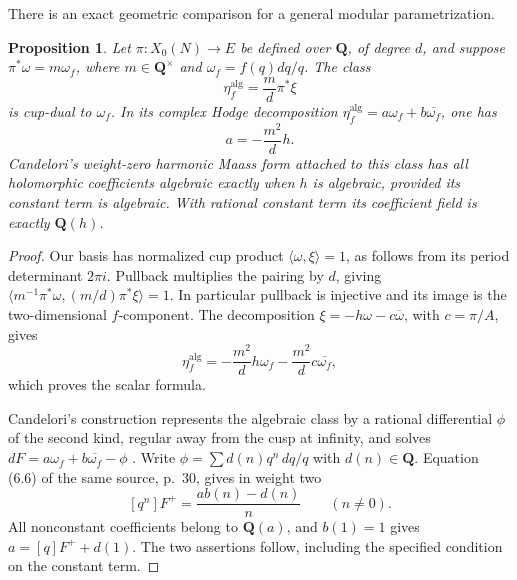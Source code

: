 \documentclass[11pt]{article}
\newtheorem{proposition}[theorem]{Proposition}
\theoremstyle{definition}\newtheorem{definition}[theorem]{Definition}
\theoremstyle{remark}\newtheorem{remark}[theorem]{Remark}
\newcommand{\Q}{\mathbf Q}\newcommand{\Z}{\mathbf Z}
\begin{document}
There is an exact geometric comparison for a general modular parametrization.
\begin{proposition}\label{prop:mock-splitting-scalar}
Let $\pi:X_0(N)\to E$ be defined over $\Q$, of degree $d$, and suppose
$\pi^*\omega=m\omega_f$, where $m\in\Q^\times$ and $\omega_f=f(q)dq/q$.
The class
\[
                   \eta_f^{\mathrm{alg}}=\frac m d\pi^*\xi
\]
is cup-dual to $\omega_f$. In its complex Hodge decomposition
$\eta_f^{\mathrm{alg}}=a\omega_f+b\overline{\omega_f}$, one has
\[
                         a=-\frac{m^2}{d}h.
\]
Candelori's weight-zero harmonic Maass form attached to this class has all holomorphic coefficients algebraic exactly when $h$ is algebraic, provided its constant term is algebraic. With rational constant term its coefficient field is exactly $\Q(h)$.
\end{proposition}
\begin{proof}
Our basis has normalized cup product $\langle\omega,\xi\rangle=1$, as follows from its period determinant $2\pi i$. Pullback multiplies the pairing by $d$, giving
$\langle m^{-1}\pi^*\omega,(m/d)\pi^*\xi\rangle=1$.
In particular pullback is injective and its image is the two-dimensional $f$-component. The decomposition
$\xi=-h\omega-c\overline\omega$, with $c=\pi/A$, gives
\[
 \eta_f^{\mathrm{alg}}
   =-\frac{m^2}{d}h\omega_f-\frac{m^2}{d}c\overline{\omega_f},
\]
which proves the scalar formula.

Candelori's construction represents the algebraic class by a rational differential $\phi$ of the second kind, regular away from the cusp at infinity, and solves
$dF=a\omega_f+b\overline{\omega_f}-\phi$
\cite[(6.5) and Proposition 6.2, pp.~27--29]{Candelori}.
Write $\phi=\sum d(n)q^n\,dq/q$ with $d(n)\in\Q$. Equation (6.6) of the same source, p.~30, gives in weight two
\[
                 [q^n]F^+=\frac{ab(n)-d(n)}n\qquad(n\ne0).
\]
All nonconstant coefficients belong to $\Q(a)$, and $b(1)=1$ gives
$a=[q]F^++d(1)$. The two assertions follow, including the specified condition on the constant term.
\end{proof}
\end{document}
